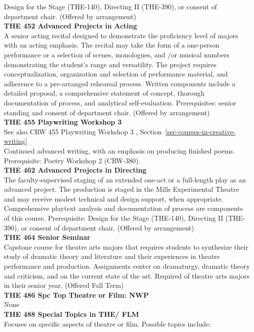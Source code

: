 \documentclass[
  letterpaper,
]{scrbook}
\begin{document}
Design for the Stage (THE-140), Directing II (THE-390), or consent of
department chair. (Offered by arrangement)\\
\textbf{THE 452 Advanced Projects in Acting}\\
A senior acting recital designed to demonstrate the proficiency level of
majors with an acting emphasis. The recital may take the form of a
one-person performance or a selection of scenes, monologues, and /or
musical numbers demonstrating the student's range and versatility. The
project requires conceptualization, organization and selection of
performance material, and adherence to a pre-arranged rehearsal process.
Written components include a detailed proposal, a comprehensive
statement of concept, thorough documentation of process, and analytical
self-evaluation. Prerequisites: senior standing and consent of
department chair. (Offered by arrangement)\\
\textbf{THE 455 Playwriting Workshop 3}\\
See also CRW 455 Playwriting Workshop 3 ,
Section~\ref{sec-courses-in-creative-writing}\\
Continued advanced writing, with an emphasis on producing finished
poems. Prerequisite: Poetry Workshop 2 (CRW-380).\\
\textbf{THE 462 Advanced Projects in Directing}\\
The faculty-supervised staging of an extended one-act or a full-length
play as an advanced project. The production is staged in the Mills
Experimental Theatre and may receive modest technical and design
support, when appropriate. Comprehensive playtext analysis and
documentation of process are components of this course. Prerequisite:
Design for the Stage (THE-140), Directing II (THE-390), or consent of
department chair. (Offered by arrangement)\\
\textbf{THE 464 Senior Seminar}\\
Capstone course for theatre arts majors that requires students to
synthesize their study of dramatic theory and literature and their
experiences in theatre performance and production. Assignments center on
dramaturgy, dramatic theory and criticism, and on the current state of
the art. Required of theatre arts majors in their senior year. (Offered
Fall Term)\\
\textbf{THE 486 Spc Top Theatre or Film: NWP}\\
None\\
\textbf{THE 488 Special Topics in THE/ FLM}\\
Focuses on specific aspects of theatre or film. Possible topics include:
\end{document}
